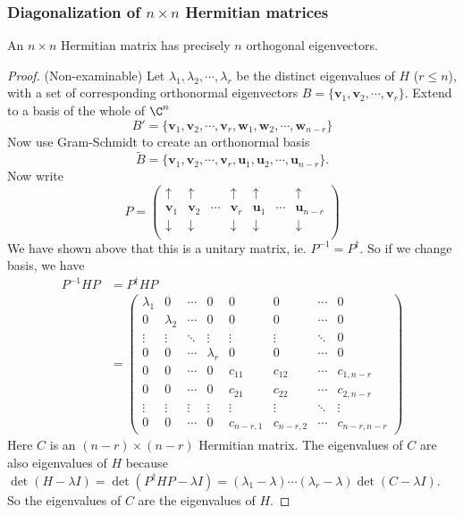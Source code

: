 \documentclass[a4paper]{article}
\begin{document}
  \subsubsection{Diagonalization of \texorpdfstring{$n\times n$}{n x n} Hermitian matrices}
  \begin{thm}
    An $n\times n$ Hermitian matrix has precisely $n$ orthogonal eigenvectors.
  \end{thm}

  \begin{proof}
    (Non-examinable) Let $\lambda_1,\lambda_2, \cdots, \lambda_r$ be the distinct eigenvalues of $H$ ($r \leq n$), with a set of corresponding orthonormal eigenvectors $B = \{\mathbf{v}_1, \mathbf{v}_2, \cdots, \mathbf{v}_r\}$. Extend to a basis of the whole of $\C^n$
    \[
      B' = \{\mathbf{v}_1, \mathbf{v}_2, \cdots, \mathbf{v}_r, \mathbf{w}_1, \mathbf{w}_2,\cdots, \mathbf{w}_{n - r}\}
    \]
    Now use Gram-Schmidt to create an orthonormal basis
    \[
      \tilde{B} = \{\mathbf{v}_1, \mathbf{v}_2, \cdots, \mathbf{v}_r, \mathbf{u}_1, \mathbf{u}_2, \cdots, \mathbf{u}_{n - r}\}.
    \]
    Now write
    \[
      P = 
      \begin{pmatrix}
        \uparrow & \uparrow & & \uparrow  & \uparrow & & \uparrow\\
        \mathbf{v}_1 & \mathbf{v}_2 & \cdots & \mathbf{v}_r & \mathbf{u}_1 & \cdots & \mathbf{u}_{n - r}\\
        \downarrow & \downarrow & & \downarrow  & \downarrow & & \downarrow\\
      \end{pmatrix}
    \]
    We have shown above that this is a unitary matrix, ie. $P^{-1} = P^\dagger$. So if we change basis, we have
    \begin{align*}
      P^{-1}HP &= P^\dagger HP\\
      &= \begin{pmatrix}
        \lambda_1 & 0 & \cdots & 0 & 0 & 0 & \cdots & 0\\
        0 & \lambda_2 & \cdots & 0 & 0 & 0 & \cdots & 0\\
        \vdots & \vdots & \ddots & \vdots & \vdots & \vdots & \ddots & 0\\
        0 & 0 & \cdots & \lambda_r & 0 & 0 & \cdots & 0\\
        0 & 0 & \cdots & 0 & c_{11} & c_{12} & \cdots & c_{1, n - r}\\
        0 & 0 & \cdots & 0 & c_{21} & c_{22} & \cdots & c_{2, n - r}\\
        \vdots & \vdots & \vdots & \vdots & \vdots & \vdots & \ddots & \vdots \\
        0 & 0 & \cdots & 0 & c_{n - r,1} & c_{n - r,2} & \cdots  & c_{n - r, n - r}
      \end{pmatrix}
    \end{align*}
    Here $C$ is an $(n - r)\times (n - r)$ Hermitian matrix. The eigenvalues of $C$ are also eigenvalues of $H$ because $\det (H - \lambda I) = \det(P^\dagger HP - \lambda I) = (\lambda_1 - \lambda)\cdots (\lambda_r - \lambda)\det (C - \lambda I)$. So the eigenvalues of $C$ are the eigenvalues of $H$.


\end{proof}
\end{document}
